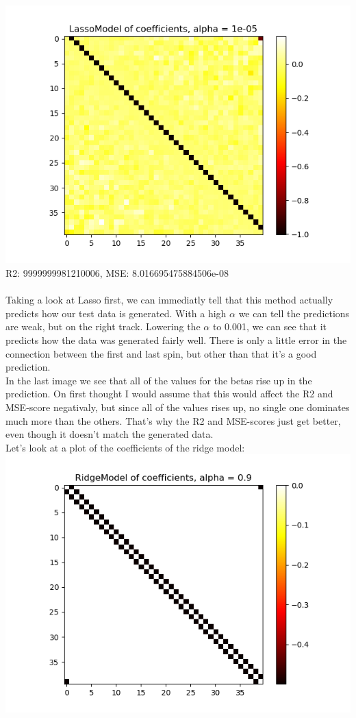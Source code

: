 \documentclass[a4paper,norsk]{article}
\begin{document}
\includegraphics[scale=.7]{images/Lassocoef000001}\\
R2: 9999999981210006, MSE: 8.016695475884506e-08\\
\\
Taking a look at Lasso first, we can immediatly tell that this method actually predicts how our test data is generated. With a high $\alpha$ we can tell the predictions are weak, but on the right track. Lowering the $\alpha$ to 0.001, we can see that it predicts how the data was generated fairly well. There is only a little error in the connection between the first and last spin, but other than that it's a good prediction.\\
In the last image we see that all of the values for the betas rise up in the prediction. On first thought I would assume that this would affect the R2 and MSE-score negativaly, but since all of the values rises up, no single one dominates much more than the others. That's why the R2 and MSE-scores just get better, even though it doesn't match the generated data.\\
Let's look at a plot of the coefficients of the ridge model:\\
\includegraphics[scale=.7]{images/Ridgecoef09}\\
\end{document}

